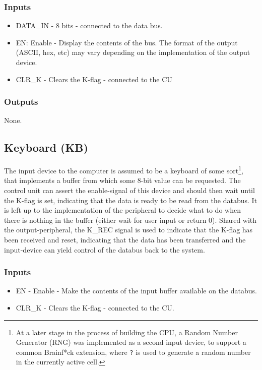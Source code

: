\subsubsection*{Inputs}
\begin{itemize}
\itemsep0em 
\item DATA\_IN - 8 bits - connected to the data bus.
\item EN: Enable - Display the contents of the bus. The format of the output (ASCII, hex, etc) may vary depending on the implementation of the output device.
\item CLR\_K - Clears the K-flag - connected to the CU
\end{itemize}

\subsubsection*{Outputs}
None.

\subsection{Keyboard (KB)} \label{sec:architecture:kb}
The input device to the computer is assumed to be a keyboard of some sort\footnote{At a later stage in the process of building the CPU, a Random Number Generator (RNG) was implemented as a second input device, to support a common Brainf*ck extension, where \texttt{?} is used to generate a random number in the currently active cell.}, that implements a buffer from which some 8-bit value can be requested. The control unit can assert the enable-signal of this device and should then wait until the K-flag is set, indicating that the data is ready to be read from the databus. It is left up to the implementation of the peripheral to decide what to do when there is nothing in the buffer (either wait for user input or return 0). Shared with the output-peripheral, the K\_REC signal is used to indicate that the K-flag has been received and reset, indicating that the data has been transferred and the input-device can yield control of the databus back to the system.

\subsubsection*{Inputs}
\begin{itemize}
\itemsep0em 
\item EN - Enable - Make the contents of the input buffer available on the databus.
\item CLR\_K - Clears the K-flag - connected to the CU.
\end{itemize}

